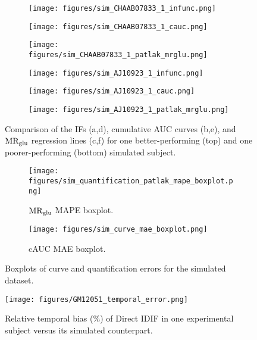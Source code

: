 \begin{figure}[h]
	\centering
	\begin{subfigure}[b]{0.322\textwidth}
		\texttt{[image: figures/sim\_CHAAB07833\_1\_infunc.png]}
		\caption{}
	\end{subfigure}
	\begin{subfigure}[b]{0.322\textwidth}
		\texttt{[image: figures/sim\_CHAAB07833\_1\_cauc.png]}
		\caption{}
	\end{subfigure}
	\begin{subfigure}[b]{0.322\textwidth}
		\texttt{[image: figures/sim\_CHAAB07833\_1\_patlak\_mrglu.png]}
		\caption{}
	\end{subfigure}
	\begin{subfigure}[b]{0.322\textwidth}
		\texttt{[image: figures/sim\_AJ10923\_1\_infunc.png]}
		\caption{}
	\end{subfigure}
	\begin{subfigure}[b]{0.322\textwidth}
		\texttt{[image: figures/sim\_AJ10923\_1\_cauc.png]}
		\caption{}
	\end{subfigure}
	\begin{subfigure}[b]{0.322\textwidth}
		\texttt{[image: figures/sim\_AJ10923\_1\_patlak\_mrglu.png]}
		\caption{}
	\end{subfigure}
	\caption{Comparison of the IFs (a,d), cumulative AUC curves (b,e), and \(\text{MR}_{\text{glu}}\) regression lines (c,f) for one better-performing (top) and one poorer-performing (bottom) simulated subject.}
	\label{fig:sim_ifs}
\end{figure}

\begin{figure}[h]
	\centering
	\begin{subfigure}[b]{0.45\textwidth}
		\texttt{[image: figures/sim\_quantification\_patlak\_mape\_boxplot.png]}
		\caption{\(\text{MR}_{\text{glu}}\) MAPE boxplot.}
		\label{subfig:sim_mape_boxplot}
	\end{subfigure}
	\begin{subfigure}[b]{0.45\textwidth}
		\texttt{[image: figures/sim\_curve\_mae\_boxplot.png]}
		\caption{cAUC MAE boxplot.}
		\label{subfig:sim_cauc_boxplot}
	\end{subfigure}
	\caption{Boxplots of curve and quantification errors for the simulated dataset.}
\end{figure}

\begin{figure}[h]
	\centering
	\texttt{[image: figures/GM12051\_temporal\_error.png]}
	\caption{Relative temporal bias (\%) of Direct IDIF in one experimental subject versus its simulated counterpart.}
	\label{fig:sim_temporal_err}
\end{figure}


